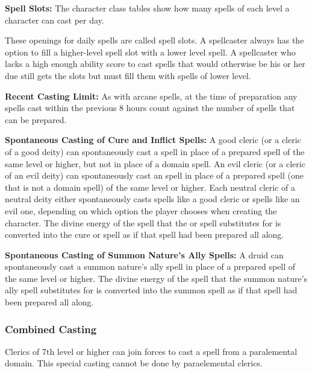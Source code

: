 \textbf{Spell Slots:} The character class tables show how many spells of each level a character can cast per day.

These openings for daily spells are called spell slots. A spellcaster always has the option to fill a higher-level spell slot with a lower level spell. A spellcaster who lacks a high enough ability score to cast spells that would otherwise be his or her due still gets the slots but must fill them with spells of lower level.

\textbf{Recent Casting Limit:} As with arcane spells, at the time of preparation any spells cast within the previous 8 hours count against the number of spells that can be prepared.

\textbf{Spontaneous Casting of Cure and Inflict Spells:} A good cleric (or a cleric of a good deity) can spontaneously cast a  spell in place of a prepared spell of the same level or higher, but not in place of a domain spell. An evil cleric (or a cleric of an evil deity) can spontaneously cast an  spell in place of a prepared spell (one that is not a domain spell) of the same level or higher. Each neutral cleric of a neutral deity either spontaneously casts  spells like a good cleric or  spells like an evil one, depending on which option the player chooses when creating the character. The divine energy of the spell that the  or  spell substitutes for is converted into the cure or  spell as if that spell had been prepared all along.

\textbf{Spontaneous Casting of Summon Nature's Ally Spells:} A druid can spontaneously cast a summon nature's ally spell in place of a prepared spell of the same level or higher. The divine energy of the spell that the summon nature's ally spell substitutes for is converted into the summon spell as if that spell had been prepared all along.

\subsubsection{Combined Casting}
Clerics of 7th level or higher can join forces to cast a spell from a paralemental domain. This special casting cannot be done by paraelemental clerics.

